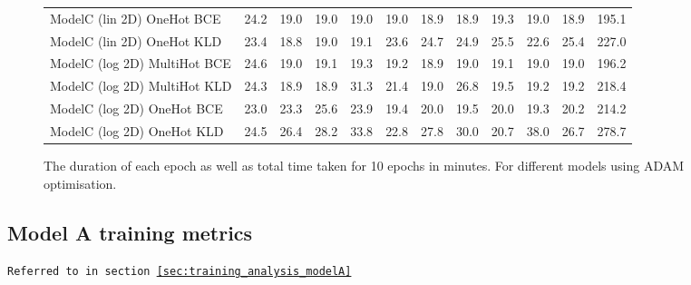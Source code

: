 \begin{appendices}
\begin{figure}[H]
\begin{footnotesize}
\begin{tabular}{l|c|c|c|c|c|c|c|c|c|c|c|}
                    ModelC (lin 2D) OneHot BCE & 24.2 & 19.0 & 19.0 & 19.0 & 19.0 & 18.9 & 18.9 & 19.3 & 19.0 & 18.9 & 195.1\\
                    ModelC (lin 2D) OneHot KLD & 23.4 & 18.8 & 19.0 & 19.1 & 23.6 & 24.7 & 24.9 & 25.5 & 22.6 & 25.4 & 227.0\\
                    ModelC (log 2D) MultiHot BCE & 24.6 & 19.0 & 19.1 & 19.3 & 19.2 & 18.9 & 19.0 & 19.1 & 19.0 & 19.0 & 196.2\\
                    ModelC (log 2D) MultiHot KLD & 24.3 & 18.9 & 18.9 & 31.3 & 21.4 & 19.0 & 26.8 & 19.5 & 19.2 & 19.2 & 218.4\\
                    ModelC (log 2D) OneHot BCE & 23.0 & 23.3 & 25.6 & 23.9 & 19.4 & 20.0 & 19.5 & 20.0 & 19.3 & 20.2 & 214.2\\
                    ModelC (log 2D) OneHot KLD & 24.5 & 26.4 & 28.2 & 33.8 & 22.8 & 27.8 & 30.0 & 20.7 & 38.0 & 26.7 & 278.7
                \end{tabular}
            \end{footnotesize}
            \caption*{The duration of each epoch as well as total time taken for 10 epochs in minutes. For different models using ADAM optimisation.}
        \end{figure}
        
        \newpage
        \subsection{Model A training metrics}
        \label{app:modelA_training}
        \texttt{Referred to in section \ref{sec:training_analysis_modelA}}
        

\end{appendices}
